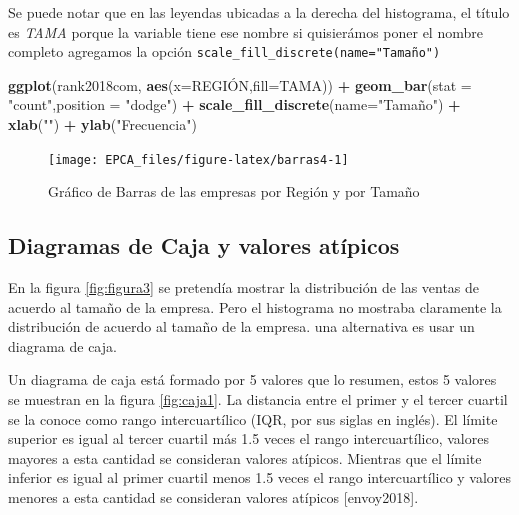 \documentclass[letterpaper,]{book}
\newenvironment{Shaded}{\begin{snugshade}}{\end{snugshade}}
\newcommand{\DataTypeTok}[1]{\textcolor[rgb]{0.13,0.29,0.53}{#1}}
\newcommand{\KeywordTok}[1]{\textcolor[rgb]{0.13,0.29,0.53}{\textbf{#1}}}
\newcommand{\NormalTok}[1]{#1}
\newcommand{\OperatorTok}[1]{\textcolor[rgb]{0.81,0.36,0.00}{\textbf{#1}}}
\newcommand{\StringTok}[1]{\textcolor[rgb]{0.31,0.60,0.02}{#1}}
\begin{document}
Se puede notar que en las leyendas ubicadas a la derecha del histograma, el título es \emph{TAMA} porque la variable tiene ese nombre si quisierámos poner el nombre completo agregamos la opción \texttt{scale\_fill\_discrete(name="Tamaño")}

\begin{Shaded}
\begin{Highlighting}[]
\KeywordTok{ggplot}\NormalTok{(rank2018com, }\KeywordTok{aes}\NormalTok{(}\DataTypeTok{x=}\NormalTok{REGIÓN,}\DataTypeTok{fill=}\NormalTok{TAMA)) }\OperatorTok{+}\StringTok{ }
\StringTok{  }\KeywordTok{geom_bar}\NormalTok{(}\DataTypeTok{stat =} \StringTok{"count"}\NormalTok{,}\DataTypeTok{position =} \StringTok{"dodge"}\NormalTok{) }\OperatorTok{+}
\StringTok{  }\KeywordTok{scale_fill_discrete}\NormalTok{(}\DataTypeTok{name=}\StringTok{"Tamaño"}\NormalTok{) }\OperatorTok{+}\StringTok{ }
\StringTok{  }\KeywordTok{xlab}\NormalTok{(}\StringTok{""}\NormalTok{) }\OperatorTok{+}\StringTok{ }\KeywordTok{ylab}\NormalTok{(}\StringTok{"Frecuencia"}\NormalTok{)}
\end{Highlighting}
\end{Shaded}

\begin{figure}[h!]

{\centering \texttt{[image: EPCA\_files/figure-latex/barras4-1]} 

}

\caption{Gráfico de Barras de las empresas por Región y por Tamaño}\label{fig:barras4}
\end{figure}

\hypertarget{boxes}{%
\subsection{Diagramas de Caja y valores atípicos}\label{boxes}}

En la figura \ref{fig:figura3} se pretendía mostrar la distribución de las ventas de acuerdo al tamaño de la empresa. Pero el histograma no mostraba claramente la distribución de acuerdo al tamaño de la empresa. una alternativa es usar un diagrama de caja.

Un diagrama de caja está formado por 5 valores que lo resumen, estos 5 valores se muestran en la figura \ref{fig:caja1}. La distancia entre el primer y el tercer cuartil se la conoce como rango intercuartílico (IQR, por sus siglas en inglés). El límite superior es igual al tercer cuartil más 1.5 veces el rango intercuartílico, valores mayores a esta cantidad se consideran valores atípicos. Mientras que el límite inferior es igual al primer cuartil menos 1.5 veces el rango intercuartílico y valores menores a esta cantidad se consideran valores atípicos {[}envoy2018{]}.
\end{document}
